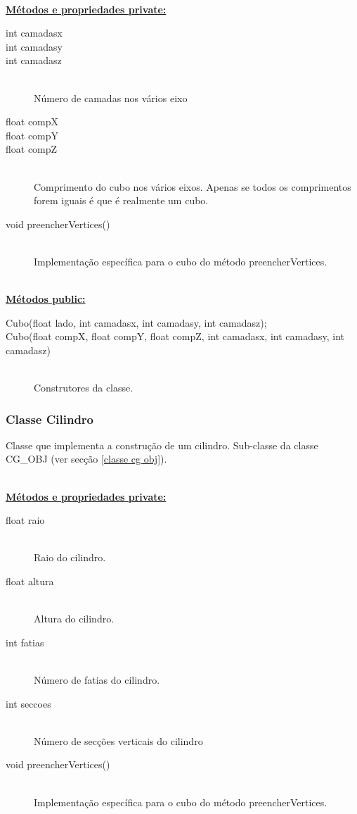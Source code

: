 \documentclass[a5paper,onecolumn, 11pt]{article}
\begin{document}
\hfill \\ \underline{\textbf{Métodos e propriedades private:}}

\begin{description}
	\item[int camadasx]
	\item[int camadasy]
	\item[int camadasz] \hfill \\
	Número de camadas nos vários eixo

	\item[float compX]
	\item[float compY]
	\item[float compZ] \hfill \\
	Comprimento do cubo nos vários eixos. Apenas se todos os comprimentos forem iguais é que é realmente um cubo.

	\item[void preencherVertices()] \hfill \\
	Implementação específica para o cubo do método preencherVertices.
\end{description}

\hfill \\ \underline{\textbf{Métodos public:}}

\begin{description}
	\item[Cubo(float lado, int camadasx, int camadasy, int camadasz);]
	\item[Cubo(float compX, float compY, float compZ, int camadasx, int camadasy, int camadasz)] \hfill \\
	Construtores da classe.
\end{description}

\clearpage
\subsubsection{Classe Cilindro} \label{classe cilindro}
Classe que implementa a construção de um cilindro. Sub-classe da classe CG\_OBJ (ver secção \ref{classe cg obj}).

\hfill \\ \underline{\textbf{Métodos e propriedades private:}}

\begin{description}
	\item[float raio] \hfill \\
	Raio do cilindro.

	\item[float altura] \hfill \\
	Altura do cilindro.

	\item[int fatias] \hfill \\
	Número de fatias do cilindro.

	\item[int seccoes] \hfill \\
	Número de secções verticais do cilindro

	\item[void preencherVertices()] \hfill \\
	Implementação específica para o cubo do método preencherVertices.
\end{description}
\end{document}
